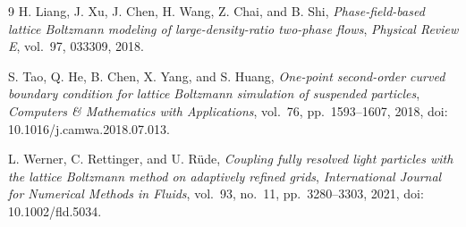 \documentclass[UTF8,zihao=-4]{ctexart}
\numberwithin{equation}{section}
\begin{document}
\begin{thebibliography}{9}
H. Liang, J. Xu, J. Chen, H. Wang, Z. Chai, and B. Shi,
\emph{Phase-field-based lattice Boltzmann modeling of large-density-ratio two-phase flows},
\emph{Physical Review E}, vol.~97, 033309, 2018.

S. Tao, Q. He, B. Chen, X. Yang, and S. Huang,
\emph{One-point second-order curved boundary condition for lattice Boltzmann simulation of suspended particles},
\emph{Computers \& Mathematics with Applications}, vol.~76, pp.~1593--1607, 2018,
doi: 10.1016/j.camwa.2018.07.013.

L. Werner, C. Rettinger, and U. R{\"u}de,
\emph{Coupling fully resolved light particles with the lattice Boltzmann method on adaptively refined grids},
\emph{International Journal for Numerical Methods in Fluids},
vol.~93, no.~11, pp.~3280--3303, 2021, doi: 10.1002/fld.5034.
\end{thebibliography}
\end{document}
